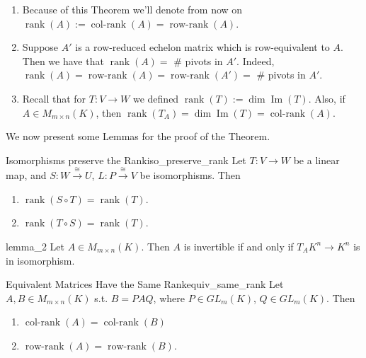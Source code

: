 \begin{remark}
	\begin{enumerate}
		\item Because of this Theorem we'll denote from now on $\operatorname{rank}(A) := \operatorname{col-rank}(A) = \operatorname{row-rank}(A)$.
		\item Suppose $A'$ is a row-reduced echelon matrix which is row-equivalent to $A$. Then we have that $\operatorname{rank}(A) =$ \# pivots in $A'$. Indeed, $\operatorname{rank}(A) = \operatorname{row-rank}(A) = \operatorname{row-rank}(A') =$ \# pivots in $A'$.
		\item Recall that for $T:V \to W$ we defined $\operatorname{rank}(T) := \dim \operatorname{Im}(T)$. Also, if $A \in M_{m \times n}(K)$, then $\operatorname{rank}(T_A) = \dim \operatorname{Im}(T) = \operatorname{col-rank}(A)$.
	\end{enumerate}
\end{remark}

We now present some Lemmas for the proof of the Theorem.

\begin{lemma}{Isomorphisms preserve the Rank}{iso_preserve_rank}
	Let $T:V \to W$ be a linear map, and $S:W \overset{\cong}{\longrightarrow} U$, $L: P \overset{\cong}{\longrightarrow} V$ be isomorphisms. Then
	\begin{enumerate}
		\item $\operatorname{rank}(S \circ T) = \operatorname{rank}(T)$.
		\item $\operatorname{rank}(T \circ S) = \operatorname{rank}(T)$.
	\end{enumerate}
\end{lemma}

\begin{lemma}{}{lemma_2}
	Let $A\in M_{m \times n}(K)$. Then $A$ is invertible if and only if $T_A K^n \to K^n$ is in isomorphism.
\end{lemma}

\begin{lemma}{Equivalent Matrices Have the Same Rank}{equiv_same_rank}
	Let $A, B \in M_{m\times n}(K)$ s.t. $B = PAQ$, where $P \in GL_m(K)$, $Q \in GL_m(K)$. Then
	\begin{enumerate}
		\item $\operatorname{col-rank}(A) = \operatorname{col-rank}(B)$
		\item $\operatorname{row-rank}(A) = \operatorname{row-rank}(B)$.
	\end{enumerate}
\end{lemma}

